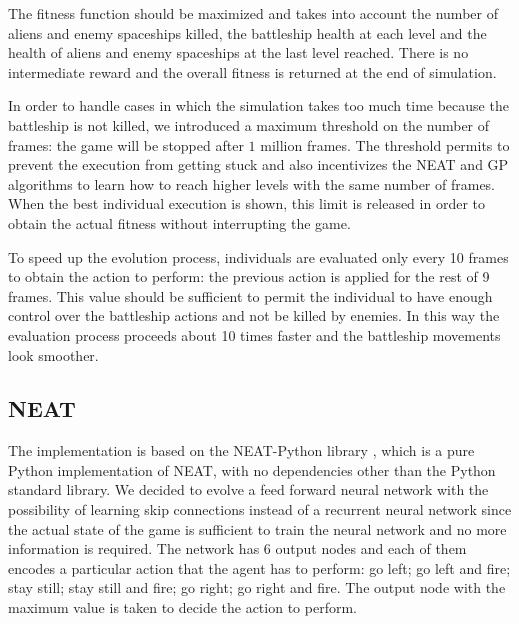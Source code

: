 The fitness function should be maximized and takes into account the number of aliens and
enemy spaceships killed, the battleship health at each level and the health of aliens and
enemy spaceships at the last level reached. There is no intermediate reward and the overall
fitness is returned at the end of simulation.

In order to handle cases in which the simulation takes too much time because the battleship
is not killed, we introduced a maximum threshold on the number of frames: the game will be
stopped after $1$ million frames. The threshold permits to prevent the execution from getting
stuck and also incentivizes the NEAT and GP algorithms to learn how to reach higher levels
with the same number of frames. When the best individual execution is shown,
this limit is released in order to obtain the actual fitness without interrupting the game.

To speed up the evolution process, individuals are evaluated only every 10 frames to obtain
the action to perform: the previous action is applied for the rest of 9 frames. This value
should be sufficient to permit the individual to have enough control over the battleship
actions and not be killed by enemies. In this way the evaluation process proceeds about 10
times faster and the battleship movements look smoother.


\subsection{NEAT}
The implementation is based on the NEAT-Python library \cite{NEAT-Python}, which is a pure Python
implementation of NEAT, with no dependencies other than the Python standard library.
We decided to evolve a feed forward neural network with the possibility of learning skip
connections instead of a recurrent neural network since the actual state of the game is
sufficient to train the neural network and no more information is required. The network has 6
output nodes and each of them encodes a particular action that the agent has to perform:
go left; go left and fire; stay still; stay still and fire; go right; go right and fire.
The output node with the maximum value is taken to decide the action to perform.

